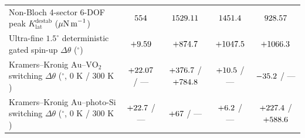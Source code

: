 \documentclass[11pt,a4paper]{article}
\begin{document}
\begin{table}[t!]
{\begin{tabular}{lcccc}
Non-Bloch 4-sector 6-DOF peak $K_{\mathrm{lat}}^{\mathrm{destab}}$ ($\mu\text{N\,m}^{-1}$) & $554{}$ & $1529.11{}$ & $1451.4{}$ & $928.57{}$ \\
Ultra-fine $1.5^\circ$ deterministic gated spin-up $\Delta\theta$ ($^\circ$) & $+9.59{}$ & $+874.7{}$ & $+1047.5{}$ & $+1066.3{}$ \\
Kramers--Kronig $\mathrm{Au}\text{--}\mathrm{VO}_2$ switching $\Delta\theta$ ($^\circ$, $0\text{ K}$ / $300\text{ K}$) & $+22.07{}$ / --- & $+376.7{}$ / $+784.8{}$ & $+10.5{}$ / --- & $-35.2{}$ / --- \\
Kramers--Kronig $\mathrm{Au}\text{--}\text{photo-Si}$ switching $\Delta\theta$ ($^\circ$, $0\text{ K}$ / $300\text{ K}$) & $+22.7{}$ / --- & $+67{}$ / --- & $+6.2{}$ / --- & $+227.4{}$ / $+588.6{}$ \\
\bottomrule
\end{tabular}%
}
\end{table}
\end{document}
